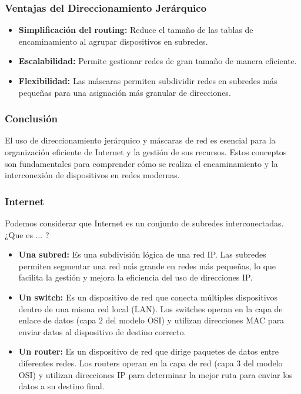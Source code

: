 \documentclass[a4paper,12pt]{article}
\begin{document}
\subsubsection*{Ventajas del Direccionamiento Jerárquico}

\begin{itemize}
    \item \textbf{Simplificación del routing:} Reduce el tamaño de las tablas de encaminamiento al agrupar dispositivos en subredes.
    \item \textbf{Escalabilidad:} Permite gestionar redes de gran tamaño de manera eficiente.
    \item \textbf{Flexibilidad:} Las máscaras permiten subdividir redes en subredes más pequeñas para una asignación más granular de direcciones.
\end{itemize}

\subsubsection*{Conclusión}

El uso de direccionamiento jerárquico y máscaras de red es esencial para la organización eficiente de Internet y la gestión de sus recursos. Estos conceptos son fundamentales para comprender cómo se realiza el encaminamiento y la interconexión de dispositivos en redes modernas.

\subsubsection*{Internet}

Podemos considerar que Internet es un conjunto de subredes interconectadas. ¿Que es ... ?
\begin{itemize}
    \item \textbf{Una subred:} Es una subdivisión lógica de una red IP. Las subredes permiten segmentar una red más grande en redes más pequeñas, lo que facilita la gestión y mejora la eficiencia del uso de direcciones IP.
    \item \textbf{Un switch:} Es un dispositivo de red que conecta múltiples dispositivos dentro de una misma red local (LAN). Los switches operan en la capa de enlace de datos (capa 2 del modelo OSI) y utilizan direcciones MAC para enviar datos al dispositivo de destino correcto.
    \item \textbf{Un router:} Es un dispositivo de red que dirige paquetes de datos entre diferentes redes. Los routers operan en la capa de red (capa 3 del modelo OSI) y utilizan direcciones IP para determinar la mejor ruta para enviar los datos a su destino final.
\end{itemize}
\end{document}
